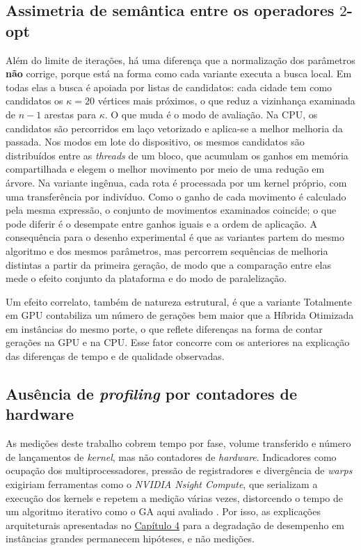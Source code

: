 \subsection{Assimetria de semântica entre os operadores \texorpdfstring{\(2\)-opt}{2-opt}}\label{sec-5311-semantica-operadores}

Além do limite de iterações, há uma diferença que a normalização dos parâmetros \textbf{não} corrige, porque está na forma como cada variante executa a busca local.
Em todas elas a busca é apoiada por listas de candidatos: cada cidade tem como candidatos os \(\kappa = 20\) vértices mais próximos, o que reduz a vizinhança examinada de \(n - 1\) arestas para \(\kappa\).
O que muda é o modo de avaliação.
Na CPU, os candidatos são percorridos em laço vetorizado e aplica-se a melhor melhoria da passada.
Nos modos em lote do dispositivo, os mesmos candidatos são distribuídos entre as \emph{threads} de um bloco, que acumulam os ganhos em memória compartilhada e elegem o melhor movimento por meio de uma redução em árvore.
Na variante ingênua, cada rota é processada por um kernel próprio, com uma transferência por indivíduo.
Como o ganho de cada movimento é calculado pela mesma expressão, o conjunto de movimentos examinados coincide; o que pode diferir é o desempate entre ganhos iguais e a ordem de aplicação.
A consequência para o desenho experimental é que as variantes partem do mesmo algoritmo e dos mesmos parâmetros, mas percorrem sequências de melhoria distintas a partir da primeira geração, de modo que a comparação entre elas mede o efeito conjunto da plataforma e do modo de paralelização.

Um efeito correlato, também de natureza estrutural, é que a variante Totalmente em GPU contabiliza um número de gerações bem maior que a Híbrida Otimizada em instâncias do mesmo porte, o que reflete diferenças na forma de contar gerações na GPU e na CPU.
Esse fator concorre com os anteriores na explicação das diferenças de tempo e de qualidade observadas.

\subsection{Ausência de \emph{profiling} por contadores de hardware}\label{sec-532-instrumentacao}

As medições deste trabalho cobrem tempo por fase, volume transferido e número de lançamentos de \emph{kernel}, mas não contadores de \emph{hardware}.
Indicadores como ocupação dos multiprocessadores, pressão de registradores e divergência de \emph{warps} exigiriam ferramentas como o \emph{NVIDIA Nsight Compute}, que serializam a execução dos kernels e repetem a medição várias vezes, distorcendo o tempo de um algoritmo iterativo como o GA aqui avaliado \autocite{nvidia2024cuda}.
Por isso, as explicações arquiteturais apresentadas no \hyperref[cap4-resultados]{Capítulo 4} para a degradação de desempenho em instâncias grandes permanecem hipóteses, e não medições.

